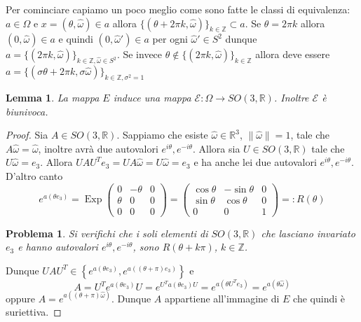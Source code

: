 \documentclass{amsart}
\numberwithin{equation}{section}
\newtheorem{lem}[thm]{Lemma}
\newtheorem{pro}{Problema}
\newcommand\cE{{\mathcal E}}
\newcommand\bR{{\mathbb R}}
\newcommand\bZ{{\mathbb Z}}
\newcommand{\homega}{\hat\omega}
\begin{document}
Per cominciare capiamo un poco meglio come sono fatte le classi di equivalenza: $a\in \Omega$  e $x=(\theta,\homega)\in a$ allora $\{(\theta+2\pi k, \homega)\}_{k\in\bZ}\subset a$. Se $\theta=2\pi k$ allora $(0,\homega)\in a$ e quindi $(0, \homega')\in a$ per ogni $\homega'\in S^2$ dunque $a=\{(2\pi k, \homega)\}_{k\in\bZ, \homega\in S^2}$. Se invece $\theta\not \in \{(2\pi k, \homega)\}_{k\in\bZ}$ allora deve essere $a=\{(\sigma\theta+2\pi k, \sigma \homega)\}_{k\in\bZ, \sigma^2=1}$
\begin{lem} La mappa $E$ induce una mappa $\cE:\Omega\to SO(3,\bR)$. Inoltre $\cE$ \`e biunivoca.
\end{lem}
\begin{proof}
Sia $A\in SO(3,\bR)$. Sappiamo che esiste  $\hat \omega\in\bR^3$, $\|\hat \omega\|=1$, tale che $A\hat\omega=\hat\omega$, inoltre avr\`a due autovalori $e^{i\theta}, e^{-i\theta}$. Allora sia $U\in SO(3,\bR)$ tale che $U\homega=e_3$.  Allora $UAU^Te_3=UA\homega=U\homega=e_3$ e ha anche lei due autovalori $e^{i\theta}, e^{-i\theta}$. D'altro canto
\begin{equation}\label{eq:expot}
e^{a(\theta e_3)}=\operatorname{Exp}\begin{pmatrix} 0&-\theta&0\\
\theta&0&0\\
0&0&0\end{pmatrix}
=\begin{pmatrix} \cos\theta&-\sin\theta&0\\
\sin\theta&\cos \theta&0\\
0&0&1\end{pmatrix}=:R(\theta)
\end{equation}

\begin{pro} Si verifichi che i soli elementi di $SO(3,\bR)$ che lasciano invariato $e_3$ e hanno autovalori $e^{i\theta}, e^{-i\theta}$, sono $R(\theta+k\pi)$, $k\in\bZ$.
\end{pro}
Dunque $UAU^T\in\left\{e^{a(\theta e_3)}, e^{a((\theta+\pi) e_3)}\right\}$ e
\[
 A=U^Te^{a(\theta e_3)}U=e^{U^Ta(\theta e_3)U}=e^{a(\theta U^Te_3)}= e^{a(\theta\homega)}
\]
oppure $A=e^{a((\theta+\pi)\homega)}$.
Dunque  $A$ appartiene all'immagine di $E$ che quindi \`e suriettiva. 


\end{proof}
\end{document}
